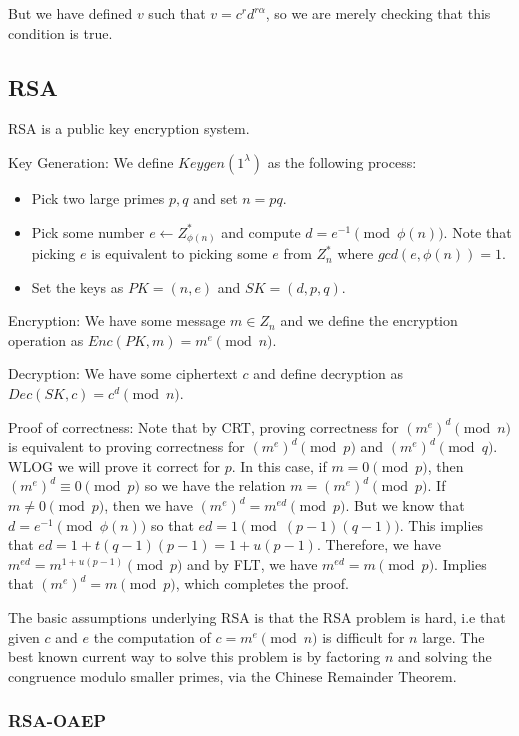 \documentclass[psamsfonts]{amsart}
\begin{document}
But we have defined $v$ such that $v = c^r d^{r \alpha}$, so we are merely checking that this condition is true.

\subsection{RSA}

RSA is a public key encryption system.

Key Generation: We define $Keygen(1^\lambda)$ as the following process:
\begin{itemize}
  \item Pick two large primes $p,q$ and set $n = pq$.
  \item Pick some number $e \leftarrow Z_{\phi(n)}^*$ and compute $d = e^{-1} \pmod{\phi(n)}$. Note that picking $e$ is equivalent to picking some $e$ from $Z_n^*$ where $gcd(e, \phi(n)) = 1$.
  \item Set the keys as $PK = (n, e)$ and $SK = (d, p, q)$.
\end{itemize}

Encryption: We have some message $m \in Z_n$ and we define the encryption operation as $Enc(PK, m) = m^e \pmod{n}$.

Decryption: We have some ciphertext $c$ and define decryption as $Dec(SK, c) = c^d \pmod{n}$.

Proof of correctness: Note that by CRT, proving correctness for $(m^e)^d \pmod{n}$ is equivalent to proving correctness for $(m^e)^d \pmod{p}$ and $(m^e)^d \pmod{q}$. WLOG we will prove it correct for $p$. In this case, if $m = 0 \pmod{p}$, then $(m^e)^d \equiv 0 \pmod{p}$ so we have the relation $m = (m^e)^d \pmod{p}$. If $m \neq 0 \pmod{p}$, then we have $(m^e)^d = m^{ed} \pmod{p}$. But we know that $d = e^{-1} \pmod{\phi(n)}$ so that $ed = 1 \pmod{(p-1)(q-1)}$. This implies that $ed = 1 + t(q-1)(p-1) = 1 + u(p-1)$. Therefore, we have $m^{ed} = m^{1+u(p-1)} \pmod{p}$ and by FLT, we have $m^{ed} = m \pmod{p}$. Implies that $(m^e)^d = m \pmod{p}$, which completes the proof.

The basic assumptions underlying RSA is that the RSA problem is hard, i.e that given $c$ and $e$ the computation of $c = m^e \pmod{n}$ is difficult for $n$ large. The best known current way to solve this problem is by factoring $n$ and solving the congruence modulo smaller primes, via the Chinese Remainder Theorem.

\subsubsection{RSA-OAEP}
\end{document}

